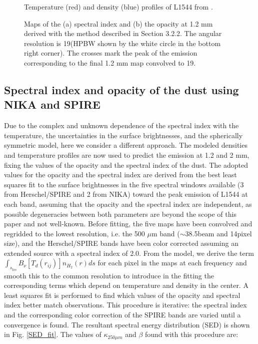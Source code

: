 \documentclass{aa}
\begin{document}
\begin{figure}
\caption{Temperature (red) and density (blue) profiles of L1544 from .}
\label{model}
\end{figure}

\begin{figure} 
\caption{Maps of the (a) spectral index and (b) the opacity at 1.2 mm derived with the method described in Section 3.2.2. The angular resolution is 19\arcsec (HPBW shown by the white circle in the bottom right corner). The crosses mark the peak of the emission corresponding to the final 1.2 mm map convolved to 19\arcsec.}
\label{kappa-beta-model}
\end{figure}


\subsection{Spectral index and opacity of the dust using NIKA and SPIRE}

Due to the complex and unknown dependence of the spectral index with the temperature, the uncertainties in the surface brightnesses, and the spherically symmetric model, here we consider a different approach. The modeled densities and temperature profiles are now used to predict the emission at 1.2 and 2 mm, fixing the values of the opacity and the spectral index of the dust.
The adopted values for the opacity and the spectral index are derived from the best least squares fit to the surface brightnesses in the five spectral windows available (3 from Herschel/SPIRE and 2 from NIKA) toward the peak emission of L1544 at each band, assuming that the opacity and the spectral index are independent, as possible degeneracies between both parameters are beyond the scope of this paper and not well-known. Before fitting, the five maps have been convolved and regridded to the lowest resolution, i.e. the 500 $\mu$m band ($\sim$38.5\arcsec beam and 14\arcsec pixel size), and the Herschel/SPIRE bands have been color corrected assuming an extended source with a spectral index of 2.0. From the model, we derive the term $\int_{s_{los}}^{}{B_{\nu}[T_{d}(r_{ij})]n_{H_{2}}(r) ds}$  for each pixel in the maps at each frequency and smooth this to the common resolution to introduce in the fitting the corresponding terms which depend on temperature and density in the center. A least squares fit is performed to find which values of the opacity and spectral index better match observations. This procedure is iterative: the spectral index and the corresponding color correction of the SPIRE bands are varied until a convergence is found. The resultant spectral energy distribution (SED) is shown in Fig. \ref{SED_fit}. The values of $\kappa_{250 \mu m}$ and $\beta$ found with this procedure are: \\
\end{document}

